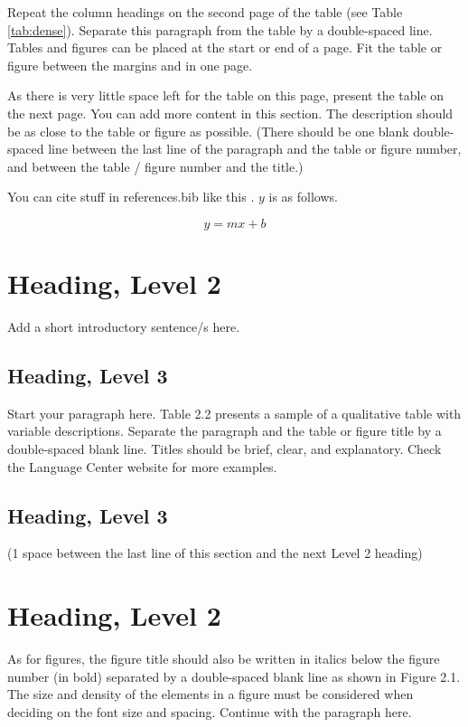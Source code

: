 Repeat the column headings on the second page of the table (see Table \ref{tab:dense}). Separate this paragraph from the table by a double-spaced line. Tables and figures can be placed at the start or end of a page. Fit the table or figure between the margins and in one page.

As there is very little space left for the table on this page, present the table on the next page.  You can add more content in this section.  The description should be as close to the table or figure as possible.
(There should be one blank double-spaced line between the last line of the paragraph and the table or figure number, and between the table / figure number and the title.)

You can cite stuff in references.bib like this \cite{doge}. $y$ is as follows.

\begin{equation}
    y = mx+b
\end{equation}

\section{Heading, Level 2}

Add a short introductory sentence/s here.

\subsection{Heading, Level 3}

Start your paragraph here. Table 2.2 presents a sample of a qualitative table with variable descriptions. Separate the paragraph and the table or figure title by a double-spaced blank line. Titles should be brief, clear, and explanatory.  Check the Language Center website for more examples.

\subsection{Heading, Level 3}

(1 space between the last line of this section and the next Level 2 heading)

\section{Heading, Level 2}
As for figures, the figure title should also be written in italics below the figure number (in bold) separated by a double-spaced blank line as shown in Figure 2.1.  The size and density of the elements in a figure must be considered when deciding on the font size and spacing.   Continue with the paragraph here.

